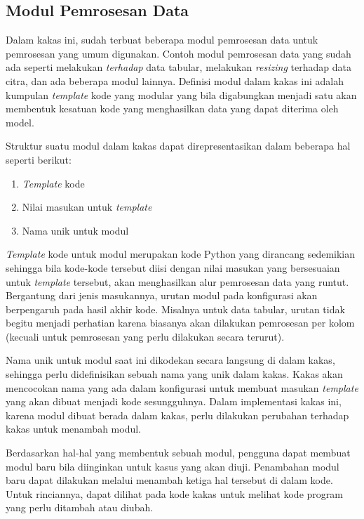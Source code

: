 \subsection{Modul Pemrosesan Data}

Dalam kakas ini, sudah terbuat beberapa modul pemrosesan data untuk pemrosesan yang umum digunakan.
Contoh modul pemrosesan data yang sudah ada seperti melakukan \textit{terhadap} data tabular, melakukan \textit{resizing} terhadap data citra, dan ada beberapa modul lainnya.
Definisi modul dalam kakas ini adalah kumpulan \textit{template} kode yang modular yang bila digabungkan menjadi satu akan membentuk kesatuan kode yang menghasilkan data yang dapat diterima oleh model.

Struktur suatu modul dalam kakas dapat direpresentasikan dalam beberapa hal seperti berikut:
\begin{enumerate}
    \item \textit{Template} kode
    \item Nilai masukan untuk \textit{template}
    \item Nama unik untuk modul
\end{enumerate}

\textit{Template} kode untuk modul merupakan kode Python yang dirancang sedemikian sehingga bila kode-kode tersebut diisi dengan nilai masukan yang bersesuaian untuk \textit{template} tersebut, akan menghasilkan alur pemrosesan data yang runtut.
Bergantung dari jenis masukannya, urutan modul pada konfigurasi akan berpengaruh pada hasil akhir kode.
Misalnya untuk data tabular, urutan tidak begitu menjadi perhatian karena biasanya akan dilakukan pemrosesan per kolom (kecuali untuk pemrosesan yang perlu dilakukan secara terurut).

Nama unik untuk modul saat ini dikodekan secara langsung di dalam kakas, sehingga perlu didefinisikan sebuah nama yang unik dalam kakas.
Kakas akan mencocokan nama yang ada dalam konfigurasi untuk membuat masukan \textit{template} yang akan dibuat menjadi kode sesungguhnya.
Dalam implementasi kakas ini, karena modul dibuat berada dalam kakas, perlu dilakukan perubahan terhadap kakas untuk menambah modul.

Berdasarkan hal-hal yang membentuk sebuah modul, pengguna dapat membuat modul baru bila diinginkan untuk kasus yang akan diuji.
Penambahan modul baru dapat dilakukan melalui menambah ketiga hal tersebut di dalam kode.
Untuk rinciannya, dapat dilihat pada kode kakas untuk melihat kode program yang perlu ditambah atau diubah.

